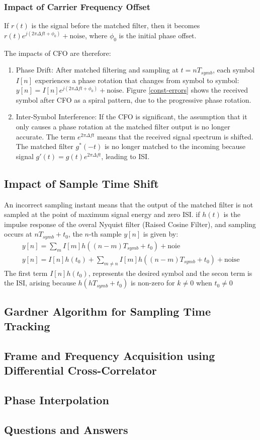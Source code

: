 \subsubsection{Impact of Carrier Frequency Offset}
If $r(t)$ is the signal before the matched filter, then it becomes $r(t) e^{j(2\pi \Delta f t + \phi_0)} + \text{noise}$, where $\phi_0$ is the initial phase offset.\par
The impacts of CFO are therefore:
\begin{enumerate}
	\item Phase Drift: After matched filtering and sampling at $t = nT_{symb}$, each symbol $I[n]$ experiences a phase rotation that changes from symbol to symbol: $y[n] = I[n] e^{j(2\pi \Delta f t + \phi_0)} + \text{noise}$. Figure \ref{const-errors} shows the received symbol after CFO as a spiral pattern, due to the progressive phase rotation.
	\item Inter-Symbol Interference: If the CFO is significant, the assumption that it only causes a phase rotation at the matched filter output is no longer accurate. The term $e^{2\pi \Delta f t}$ means that the received signal spectrum is shifted. The matched filter $g^*(-t)$ is no longer matched to the incoming because signal $g'(t) = g(t) e^{2\pi \Delta f t}$, leading to ISI.
\end{enumerate}
\subsection{Impact of Sample Time Shift}
An incorrect sampling instant means that the output of the matched filter is not sampled at the point of maximum signal energy and zero ISI. if $h(t)$ is the impulse response of the overal Nyquist filter (Raised Cosine Filter), and sampling occurs at $nT_{symb} + t_0$, the $n$-th sample $y[n]$ is given by:
\begin{align}
	y[n] = \sum_m I[m]h((n-m)T_{symb} + t_0) + \text{noie}\\
	y[n] = I[n]h(t_0) + \sum_{m \neq n} I[m]h((n-m)T_{symb} + t_0) + \text{noise}
\end{align}
The first term $I[n]h(t_0)$, represents the desired symbol and the secon term is the ISI, arising because $h(hT_{symb} + t_0)$ is non-zero for $k \neq 0$ when $t_0 \neq 0$
\subsection{Gardner Algorithm for Sampling Time Tracking}
\subsection{Frame and Frequency Acquisition using Differential Cross-Correlator}
\subsection{Phase Interpolation}
\subsection{Questions and Answers}